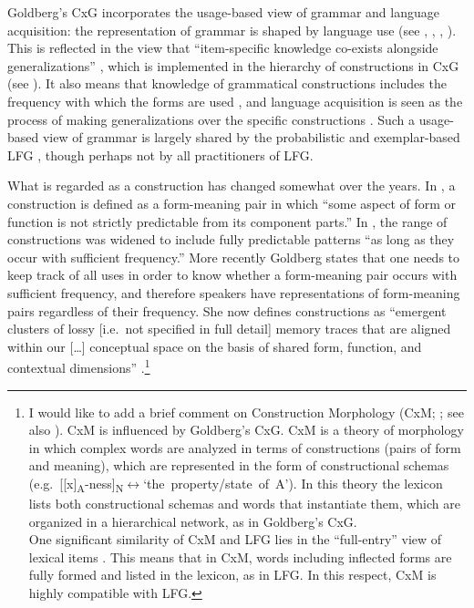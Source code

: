 \documentclass[output=paper,japanesefont,hidelinks]{langscibook}
\begin{document}
Goldberg's CxG incorporates the usage-based view of grammar and language acquisition: the representation of grammar is shaped by language use (see \citealt{Langacker1988}, \citealt{BarlowKemmer2000}, \citealt{Bybee2006}, \citealt{Diessel2015,Diessel2019}). This is reflected in the view that ``item-specific knowledge co-exists alongside generalizations'' \citep[12]{Goldberg2006}, which is implemented in the hierarchy of constructions in CxG (see ). It also means that knowledge of grammatical constructions includes the frequency with which the forms are used \citep{Goldberg2006,Diessel2015,Perek2015}, and language acquisition is seen as the process of making generalizations over the specific constructions \citep{Goldberg2006,GoldbergCasenhiserSethuraman2004,Tomasello2003}. Such a usage-based view of grammar is largely shared by the probabilistic and exemplar-based LFG \citep{BresnanHay2008,BresnanFord2010}, though perhaps not by all practitioners of LFG.

\largerpage[-2]
What is regarded as a construction has changed somewhat over the years. In \citet[4]{goldberg1995constructions}, a construction is defined as a form-meaning pair in which ``some aspect of form or function is not strictly predictable from its component parts.'' In \citet[5]{Goldberg2006}, the range of constructions was widened to include fully predictable patterns ``as long as they occur with sufficient frequency.'' More recently Goldberg states that one needs to keep track of all uses in order to know whether a form-meaning pair occurs with sufficient frequency, and therefore speakers have representations of form-meaning pairs regardless of their frequency.  She now defines constructions as ``emergent clusters of lossy [i.e.\ not specified in full detail] memory traces that are aligned within our […] conceptual space on the basis of shared form, function, and contextual dimensions'' \citep[8]{Goldberg2019}.\footnote{I would like to add a brief comment on Construction Morphology (CxM; \citealt{Booij2008,Booij2010,Booij2018}; see also \citealt{ChenMatsumoto2018}). CxM is influenced by Goldberg's CxG. CxM is a theory of morphology in which complex words are analyzed in terms of constructions (pairs of form and meaning), which are represented in the form of constructional schemas (e.g.\ \mbox{[[x]\textsubscript{A}-ness]\textsubscript{N}\/$\leftrightarrow$\/`the property/state of A'}). In this theory the lexicon lists both constructional schemas and words that instantiate them, which are organized in a hierarchical network, as in Goldberg's CxG.\\[.5ex] One significant similarity of CxM and LFG lies in the ``full-entry'' view of lexical items \citep{jackendoff1997the-architecture,JackendoffAudring2019}. This means that in CxM, words including inflected forms are fully formed and listed in the lexicon, as in LFG. In this respect, CxM is highly compatible with LFG.}
\end{document}

